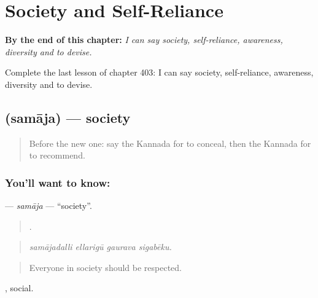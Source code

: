 
\chapter{Society and Self-Reliance}
\label{ch:ka-society-and-self-reliance}

\begin{chapteropening}
\textbf{By the end of this chapter:} \emph{I can say society, self-reliance, awareness, diversity and to devise.}

Complete the last lesson of chapter 403: I can say society, self-reliance, awareness, diversity and to devise.
\end{chapteropening}

\section[\texorpdfstring{\kn{ಸಮಾಜ} (samāja)}{ಸಮಾಜ (samāja)}]{ (samāja) — society}

\label{lesson:KA-C403-samaja}



\begin{quote}
Before the new one: say the Kannada for to conceal, then the Kannada for to recommend.
\end{quote}

\subsection*{You'll want to know: }
\textbf{} — \emph{samāja} — \textquotedblleft{}society\textquotedblright{}.

\begin{quote}
   .
\end{quote}

\begin{quote}
\emph{samājadalli ellarigū gaurava sigabēku.}
\end{quote}

\begin{quote}
Everyone in society should be respected.
\end{quote}

, social.

